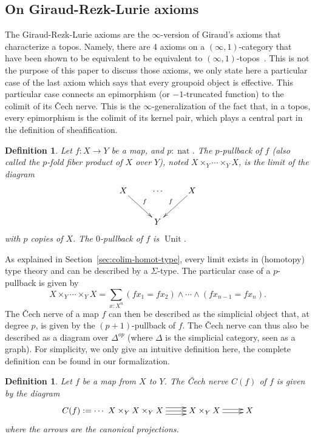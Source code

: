 \documentclass[conference]{IEEEtran}
\makeatletter
\newtheorem{defi}[thm]{Definition}
\def\dar[#1]#2{\ar@<-#2>[#1]\ar@<#2>[#1]} %
\def\tar[#1]#2{\ar@<#2>[#1]\ar@<0pt>[#1]\ar@<-#2>[#1]} %
\DeclareMathOperator{\nat}{nat}
\DeclareMathOperator{\Unit}{Unit}
\makeatother
\begin{document}
\subsection{On Giraud-Rezk-Lurie axioms}
\label{sec:giraud-ax}

The Giraud-Rezk-Lurie axioms are the $\infty$-version of Giraud's
axioms that characterize a topos. Namely, there are 4 axioms on a
$(\infty,1)$-category that have been shown to be equivalent to be
equivalent to $(\infty,1)$-topos~\cite[Chapter 6]{lurie}. This is not
the purpose of this paper to discuss those axioms, we only state here
a particular case of the last axiom which says that every groupoid
object is effective. 
%
This particular case connects an epimorphism (or $-1$-truncated
function) to the colimit of its \v{C}ech nerve. 
%
This is the $\infty$-generalization of the fact that, in a topos,
every epimorphism is the colimit of its kernel pair, which plays a
central part in the definition of sheafification.

\begin{defi}
  Let $f:X \to Y$ be a map, and $p:\nat$. The $p$-pullback of $f$
  (also called the $p$-fold fiber product of $X$ over $Y$),
  noted $X\times_Y \cdots\times_Y X$, is
  the limit of the diagram
  $$\xymatrix{
    X \ar[rd]^f & \cdots & X \ar[ld]_f \\
      &    Y   &
  }$$
  with $p$ copies of $X$. The $0$-pullback of $f$ is $\Unit$.
\end{defi}

As explained in Section~\ref{sec:colim-homot-type}, every limit exists
in (homotopy) type theory and can be described by a $\Sigma$-type. 
%
The particular case of a $p$-pullback is given by
%
$$
X\times_Y \cdots\times_Y X = \sum_{x:X^n} (f x_1 = f x_2) \land
\cdots \land (f x_{n-1} = f x_n).
$$
%
The \v{C}ech nerve of a map $f$ can then be described as the
simplicial object that, at degree $p$, is given by the
$(p+1)$-pullback of $f$. The \v{C}ech nerve can thus also be described
as a diagram over $\Delta^{op}$ (where $\Delta$ is the simplicial
category, seen as a graph). For simplicity, we only give an intuitive
definition here, the complete definition can be found in our
formalization.
%
\begin{defi}
  Let $f$ be a map from $X$ to $Y$. The {\em \v{C}ech nerve} $C(f)$ of $f$
  is given by the diagram
  $$\xymatrix{
    C(f) := \cdots~ X \times_Y X \times_Y X \tar[r]{4pt} & X \times_Y X \dar[r]{2pt} & X
  }$$
where the arrows are the canonical projections.
\end{defi}
\end{document}
